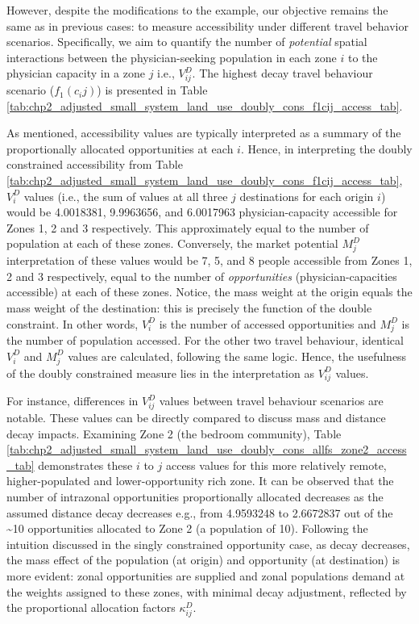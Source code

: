 \documentclass[
11pt, %
oneside, %
english, %
singlespacing, %
]{macthesis} %
\begin{document}


However, despite the modifications to the example, our objective remains the same as in previous cases: to measure accessibility under different travel behavior scenarios. Specifically, we aim to quantify the number of \emph{potential} spatial interactions between the physician-seeking population in each zone \(i\) to the physician capacity in a zone \(j\) i.e., \(V_{ij}^D\). The highest decay travel behaviour scenario (\(f_1(c_ij)\)) is presented in Table \ref{tab:chp2_adjusted_small_system_land_use_doubly_cons_f1cij_access_tab}.



As mentioned, accessibility values are typically interpreted as a summary of the proportionally allocated opportunities at each \(i\). Hence, in interpreting the doubly constrained accessibility from Table \ref{tab:chp2_adjusted_small_system_land_use_doubly_cons_f1cij_access_tab}, \(V_i^D\) values (i.e., the sum of values at all three \(j\) destinations for each origin \(i\)) would be 4.0018381, 9.9963656, and 6.0017963 physician-capacity accessible for Zones 1, 2 and 3 respectively. This approximately equal to the number of population at each of these zones. Conversely, the market potential \(M_j^D\) interpretation of these values would be 7, 5, and 8 people accessible from Zones 1, 2 and 3 respectively, equal to the number of \emph{opportunities} (physician-capacities accessible) at each of these zones. Notice, the mass weight at the origin equals the mass weight of the destination: this is precisely the function of the double constraint. In other words, \(V_i^D\) is the number of accessed opportunities and \(M_j^D\) is the number of population accessed. For the other two travel behaviour, identical \(V_i^D\) and \(M_j^D\) values are calculated, following the same logic. Hence, the usefulness of the doubly constrained measure lies in the interpretation as \(V_{ij}^D\) values.

For instance, differences in \(V_{ij}^D\) values between travel behaviour scenarios are notable. These values can be directly compared to discuss mass and distance decay impacts. Examining Zone 2 (the bedroom community), Table \ref{tab:chp2_adjusted_small_system_land_use_doubly_cons_allfs_zone2_access_tab} demonstrates these \(i\) to \(j\) access values for this more relatively remote, higher-populated and lower-opportunity rich zone. It can be observed that the number of intrazonal opportunities proportionally allocated decreases as the assumed distance decay decreases e.g., from 4.9593248 to 2.6672837 out of the \textasciitilde10 opportunities allocated to Zone 2 (a population of 10). Following the intuition discussed in the singly constrained opportunity case, as decay decreases, the mass effect of the population (at origin) and opportunity (at destination) is more evident: zonal opportunities are supplied and zonal populations demand at the weights assigned to these zones, with minimal decay adjustment, reflected by the proportional allocation factors \(\kappa_{ij}^D\).
\end{document}

